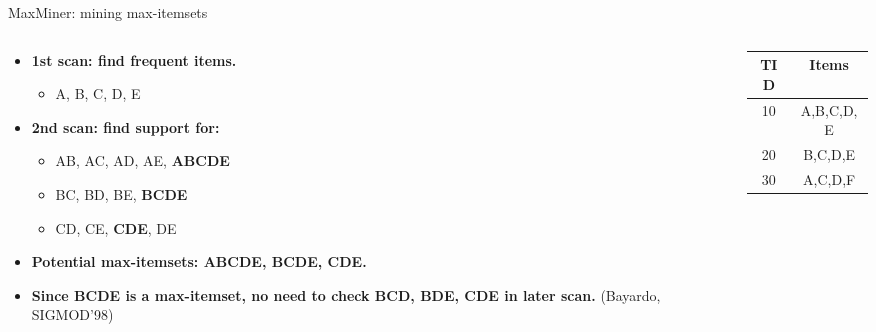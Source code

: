 \documentclass[aspectratio=169,t,xcolor=dvipsnames]{beamer}
\begin{document}
  {
    \begin{frame}{MaxMiner: mining max-itemsets}
      \begin{columns}
        \begin{column}{0.6\textwidth}
        \begin{itemize}
            \item \textbf{1st scan: find frequent items.}
            \begin{itemize}
              \item A, B, C, D, E
            \end{itemize}
            \item \textbf{2nd scan: find support for:}
            \begin{itemize}
              \item AB, AC, AD, AE, \textbf{ABCDE}
              \item BC, BD, BE, \textbf{BCDE}
              \item CD, CE, \textbf{CDE}, DE
            \end{itemize}
            \item \textbf{Potential max-itemsets: ABCDE, BCDE, CDE.}
            \item \textbf{Since BCDE is a max-itemset, no need to check BCD, BDE, CDE in later scan.} (Bayardo, SIGMOD'98)
        \end{itemize}
      \end{column}
      \begin{column}{0.3\textwidth}
        \begin{tabular}{|c|c|}
          \hline
          TID & Items \\\hline
          10 & A,B,C,D,E \\\hline
          20 & B,C,D,E \\\hline
          30 & A,C,D,F \\\hline
        \end{tabular}
      \end{column}
      \end{columns}
    \end{frame}
  }
\end{document}
